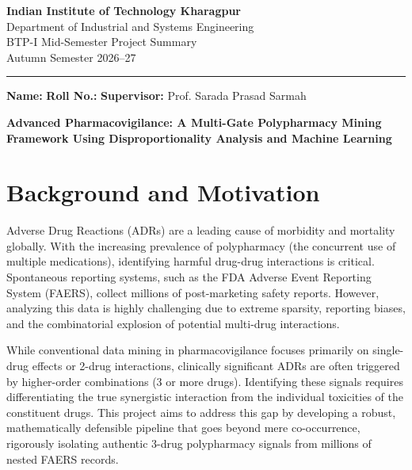 \documentclass[11pt,a4paper]{article}
\begin{document}
\begin{center}
    
    {\Large \bfseries Indian Institute of Technology Kharagpur}\\[0.2cm]
    {\large Department of Industrial and Systems Engineering}\\[0.2cm]
    {\normalsize BTP-I Mid-Semester Project Summary}\\[0.1cm]
    {\normalsize Autumn Semester 2026--27}\\[0.3cm]
    \rule{\textwidth}{0.5pt}
\end{center}

\noindent
\textbf{Name:}  
\textbf{Roll No.:}  
\textbf{Supervisor:} Prof. Sarada Prasad Sarmah

\vspace{0.4cm}
\begin{center}
    {\Large \bfseries Advanced Pharmacovigilance: A Multi-Gate Polypharmacy Mining Framework Using Disproportionality Analysis and Machine Learning}
\end{center}
\vspace{0.2cm}

\section*{Background and Motivation}
Adverse Drug Reactions (ADRs) are a leading cause of morbidity and mortality globally. With the increasing prevalence of polypharmacy (the concurrent use of multiple medications), identifying harmful drug-drug interactions is critical. Spontaneous reporting systems, such as the FDA Adverse Event Reporting System (FAERS), collect millions of post-marketing safety reports. However, analyzing this data is highly challenging due to extreme sparsity, reporting biases, and the combinatorial explosion of potential multi-drug interactions.

While conventional data mining in pharmacovigilance focuses primarily on single-drug effects or 2-drug interactions, clinically significant ADRs are often triggered by higher-order combinations (3 or more drugs). Identifying these signals requires differentiating the true synergistic interaction from the individual toxicities of the constituent drugs. This project aims to address this gap by developing a robust, mathematically defensible pipeline that goes beyond mere co-occurrence, rigorously isolating authentic 3-drug polypharmacy signals from millions of nested FAERS records.
\end{document}
